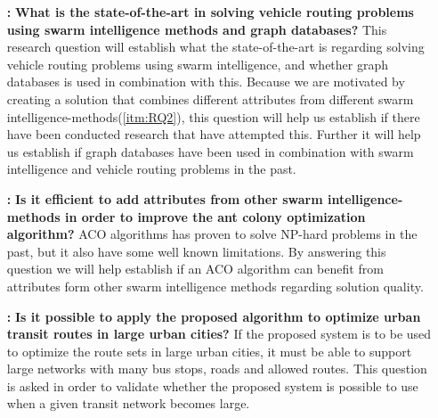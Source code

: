 \begin{itemize}

    \item[\textbf{\namedlabel{itm:RQ1}{RQ 1}:}] \textbf{What is the state-of-the-art in solving vehicle routing problems using swarm intelligence methods and graph databases?}
    \newline
    This research question will establish what the state-of-the-art is regarding solving vehicle routing problems using swarm intelligence, and whether graph databases is used in combination with this. Because we are motivated by creating a solution that combines different attributes from different swarm intelligence-methods(\ref{itm:RQ2}), this question will help us establish if there have been conducted research that have attempted this. Further it will help us establish if graph databases have been used in combination with swarm intelligence and vehicle routing problems in the past.  

    \item[\textbf{\namedlabel{itm:RQ2}{RQ 2}:}]\label{itm:RQ2} \textbf{Is it efficient to add attributes from other swarm intelligence-methods in order to improve the ant colony optimization algorithm?}
    \newline
    ACO algorithms has proven to solve NP-hard problems in the past, but it also have some well known limitations. By answering this question we will help establish if an ACO algorithm can benefit from attributes form other swarm intelligence methods regarding solution quality. 

    \item[\textbf{\namedlabel{itm:RQ3}{RQ 3}:}]\label{itm:RQ3}\textbf{Is it possible to apply the proposed algorithm to optimize urban transit routes in large urban cities?}
    \newline
    If the proposed system is to be used to optimize the route sets in large urban cities, it must be able to support large networks with many bus stops, roads and allowed routes. This question is asked in order to validate whether the proposed system is possible to use when a given transit network becomes large. 
\end{itemize}



